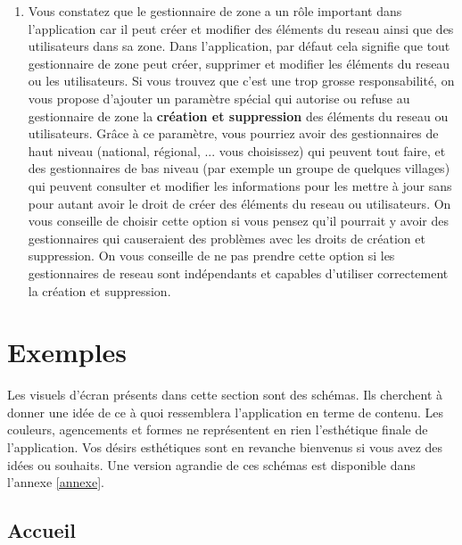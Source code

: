 \documentclass[a4paper, 11pt]{article}
\begin{document}
\begin{mdframed}[style=HighlightQuestion]
\begin{enumerate}
      \item Vous constatez que le gestionnaire de \gls{zone} a un rôle important dans l'\gls{application} car il peut créer et modifier des éléments du \gls{reseau} ainsi que des \glspl{utilisateur} dans sa \gls{zone}. Dans l'\gls{application}, par défaut cela signifie que tout gestionnaire de \gls{zone} peut créer, supprimer et modifier les éléments du \gls{reseau} ou les \glspl{utilisateur}. Si vous trouvez que c'est une trop grosse responsabilité, on vous propose d'ajouter un paramètre spécial qui autorise ou refuse au gestionnaire de \gls{zone} la \textbf{création et suppression} des éléments du \gls{reseau} ou \glspl{utilisateur}. Grâce à ce paramètre, vous pourriez avoir des gestionnaires de haut niveau (national, régional, ... vous choisissez) qui peuvent tout faire, et des gestionnaires de bas niveau (par exemple un groupe de quelques villages) qui peuvent consulter et modifier les informations pour les mettre à jour sans pour autant avoir le droit de créer des éléments du \gls{reseau} ou \glspl{utilisateur}. On vous conseille de choisir cette option si vous pensez qu'il pourrait y avoir des gestionnaires qui causeraient des problèmes avec les droits de création et suppression. On vous conseille de ne pas prendre cette option si les gestionnaires de \gls{reseau} sont indépendants et capables d'utiliser correctement la création et suppression.
    \end{enumerate}
  \end{mdframed}

\section{Exemples}
  \begin{shaded}
    Les visuels d'écran présents dans cette section sont des schémas. Ils cherchent à donner une idée de ce à quoi ressemblera l'\gls{application} en terme de contenu. Les couleurs, agencements et formes ne représentent en rien l'esthétique finale de l'\gls{application}. Vos désirs esthétiques sont en revanche bienvenus si vous avez des idées ou souhaits. Une version agrandie de ces schémas est disponible dans l'annexe \ref{annexe}.
  \end{shaded}

  \subsection{Accueil}
\end{document}
